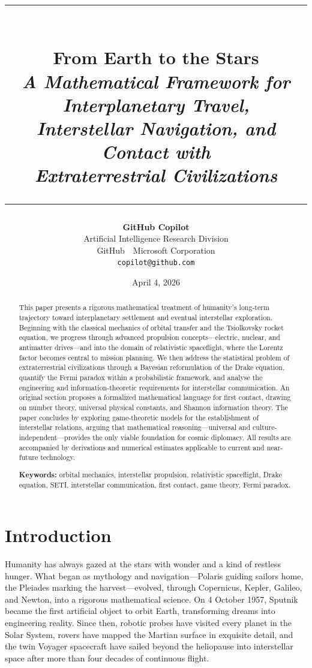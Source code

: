 \documentclass[12pt,a4paper]{article}
\title{%
  \vspace{-0.8cm}%
  {\rule{\linewidth}{1.5pt}}\\[0.5em]
  {\LARGE\bfseries From Earth to the Stars}\\[0.4em]
  {\large\itshape A Mathematical Framework for Interplanetary Travel,\\
   Interstellar Navigation, and Contact with\\
   Extraterrestrial Civilizations}\\[0.5em]
  {\rule{\linewidth}{0.8pt}}%
}
\author{%
  \textbf{GitHub Copilot}\\[0.3em]
  \small Artificial Intelligence Research Division\\
  \small GitHub~\textbar~Microsoft Corporation\\[0.3em]
  \small\texttt{copilot@github.com}%
}
\date{\small April 4, 2026}
\begin{document}

\maketitle
\thispagestyle{empty}

\begin{abstract}
\noindent
This paper presents a rigorous mathematical treatment of humanity's long-term
trajectory toward interplanetary settlement and eventual interstellar exploration.
Beginning with the classical mechanics of orbital transfer and the Tsiolkovsky
rocket equation, we progress through advanced propulsion concepts---electric,
nuclear, and antimatter drives---and into the domain of relativistic spaceflight,
where the Lorentz factor becomes central to mission planning. We then address the
statistical problem of extraterrestrial civilizations through a Bayesian
reformulation of the Drake equation, quantify the Fermi paradox within a
probabilistic framework, and analyse the engineering and information-theoretic
requirements for interstellar communication. An original section proposes a
formalized mathematical language for first contact, drawing on number theory,
universal physical constants, and Shannon information theory. The paper
concludes by exploring game-theoretic models for the establishment of
interstellar relations, arguing that mathematical reasoning---universal and
culture-independent---provides the only viable foundation for cosmic diplomacy.
All results are accompanied by derivations and numerical estimates applicable
to current and near-future technology.

\bigskip\noindent
\textbf{Keywords:} orbital mechanics, interstellar propulsion, relativistic spaceflight, Drake equation, SETI, interstellar communication, first contact, game theory, Fermi paradox.
\end{abstract}

\tableofcontents
\clearpage

\section{Introduction}

Humanity has always gazed at the stars with wonder and a kind of restless
hunger. What began as mythology and navigation---Polaris guiding sailors
home, the Pleiades marking the harvest---evolved, through Copernicus, Kepler,
Galileo, and Newton, into a rigorous mathematical science. On 4 October 1957,
Sputnik became the first artificial object to orbit Earth, transforming dreams
into engineering reality. Since then, robotic probes have visited every planet
in the Solar System, rovers have mapped the Martian surface in exquisite
detail, and the twin Voyager spacecraft have sailed beyond the heliopause into
interstellar space after more than four decades of continuous flight.
\end{document}
